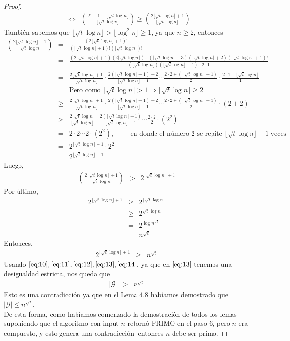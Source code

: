 \documentclass[10pt]{article}
\newcommand{\0}{\mathbf{0}}
\newcommand{\1}{\mathbf{1}}
\newcommand{\mia}{\lfloor\sqrt{t}\log  n\rfloor}
\newcommand{\+}{\oplus}
\newcommand{\comentario}[1]{}
\theoremstyle{remark}
\theoremstyle{remark}
\begin{document}
\begin{proof}
\begin{eqnarray}
	&\Leftrightarrow &{{\ell +1+\mia}\choose{\mia}}\geq {{2\mia +1}\choose{\mia}}\label{eq:12}
\end{eqnarray}
	También sabemos que $\mia > \lfloor \log ^2n\rfloor\geq 1$, ya que $n\geq 2$\comentario{esto no se por que es desigualdad estricta, sin embargo es arreglable si comenzamos de n>2, ya que la ultima desigualdad pasaria a ser estricta}, entonces
	\begin{eqnarray}
		{{2\mia +1}\choose{\mia}} &=& \frac{(2\mia +1)!}{(\mia +1)!(\mia)!} \nonumber\\
		&=&\frac{(2\mia+1)(2\mia)\cdots(\mia+3)(\mia +2)(\mia +1)!}{(\mia)(\mia -1)\cdots2\cdot 1}\nonumber\\
		&=&\frac{2\mia+1}{\mia}\cdot\frac{2(\mia -1)+2}{\mia-1}\cdots\frac{2\cdot 2 + (\mia-1)}{2}\cdot\frac{2\cdot 1 +\mia}{1}\nonumber\\
		& &\text{Pero como }\mia >1 \Rightarrow \mia \geq 2\nonumber\\
		&\geq& \frac{2\mia+1}{\mia}\cdot\frac{2(\mia -1)+2}{\mia-1}\cdots\frac{2\cdot 2 + (\mia-1)}{2}\cdot (2+2)\nonumber\\
		&>&	\frac{2\mia}{\mia}\cdot\frac{2(\mia -1)}{\mia-1}\cdots\frac{2\cdot 2 }{2}\cdot (2^2)\nonumber\\
		&=& 2\cdot 2\cdots 2\cdot (2^2),\hspace{1cm}\text{en donde el número } 2 \text{ se repite }\mia-1 \text{ veces}\nonumber\\
		&=& 2^{\mia -1}\cdot 2^2\nonumber\\ 
		&=& 2^{\mia +1}\nonumber
	\end{eqnarray}
	Luego, 
	\begin{eqnarray}
		{{2\mia +1}\choose{\mia}}&>& 2^{\mia +1}\label{eq:13} 
	\end{eqnarray}
	Por último,
	\begin{eqnarray}
		 2^{\mia +1} &\geq &  2^{\lceil \sqrt{t} \log n \rceil}\nonumber\\
		 &\geq &2^{\sqrt{t}\log n}\nonumber\\
		 &=& 2^{\log {n^{\sqrt{t}}}}\nonumber\\
		 &=& n^{\sqrt{t}}\nonumber
	\end{eqnarray}
	Entonces,
	\begin{eqnarray}
		2^{\mia +1} &\geq & n^{\sqrt{t}}\label{eq:14}
	\end{eqnarray}
	Usando $\eqref{eq:10},\eqref{eq:11},\eqref{eq:12},\eqref{eq:13},\eqref{eq:14}$, ya que en $\eqref{eq:13}$ tenemos una desigualdad estricta, nos queda que 
	\begin{eqnarray}
		|\mathcal{G}|&>& n^{\sqrt{t}}\nonumber
	\end{eqnarray}
	Esto es una contradicción ya que en el Lema 4.8 habí­amos demostrado que $|\mathcal{G}|\leq n^{\sqrt{t}}$. \\
	De esta forma, como habí­amos comenzado la demostración de todos los lemas suponiendo que el algoritmo con input $n$ retornó PRIMO en el paso 6, pero $n$ era compuesto, y esto genera una contradicción, entonces $n$ debe ser primo. 
	
	\end{proof}




\appendix


\end{document}
